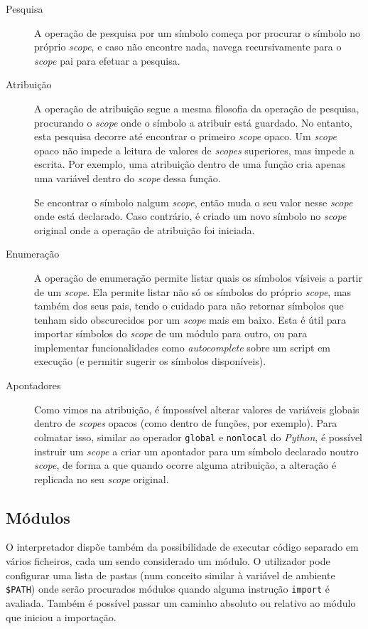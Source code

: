 \begin{description}
 \item[Pesquisa] A operação de pesquisa por um símbolo começa por procurar o símbolo no próprio \textit{scope}, e caso não encontre nada, navega recursivamente para o \textit{scope} pai para efetuar a pesquisa.
 
 \item[Atribuição] A operação de atribuição segue a mesma filosofia da operação de pesquisa, procurando o \textit{scope} onde o símbolo a atribuir está guardado. No entanto, esta pesquisa decorre até encontrar o primeiro \textit{scope} opaco. Um \textit{scope} opaco não impede a leitura de valores de \textit{scopes} superiores, mas impede a escrita. Por exemplo, uma atribuição dentro de uma função cria apenas uma variável dentro do \textit{scope} dessa função.
 
 Se encontrar o símbolo nalgum \textit{scope}, então muda o seu valor nesse \textit{scope} onde está declarado. Caso contrário, é criado um novo símbolo no \textit{scope} original onde a operação de atribuição foi iniciada.
 
 \item[Enumeração] A operação de enumeração permite listar quais os símbolos vísiveis a partir de um \textit{scope}. Ela permite listar não só os símbolos do próprio \textit{scope}, mas também dos seus pais, tendo o cuidado para não retornar símbolos que tenham sido obscurecidos por um \textit{scope} mais em baixo. Esta é útil para importar símbolos do \textit{scope} de um módulo para outro, ou para implementar funcionalidades como \textit{autocomplete} sobre um script em execução (e permitir sugerir os símbolos disponíveis).
 
 \item[Apontadores] Como vimos na atribuição, é ímpossível alterar valores de variáveis globais dentro de \textit{scopes} opacos (como dentro de funções, por exemplo). Para colmatar isso, similar ao operador \texttt{global} e \texttt{nonlocal} do \textit{Python}, é possível instruir um \textit{scope} a criar um apontador para um símbolo declarado noutro \textit{scope}, de forma a que quando ocorre alguma atribuição, a alteração é replicada no seu \textit{scope} original.
\end{description}

\subsection{Módulos}
O interpretador dispõe também da possibilidade de executar código separado em vários ficheiros, cada um sendo considerado um módulo. O utilizador pode configurar uma lista de pastas (num conceito similar à variável de ambiente \texttt{\$PATH}) onde serão procurados módulos quando alguma instrução \texttt{import} é avaliada. Também é possível passar um caminho absoluto ou relativo ao módulo que iniciou a importação.

